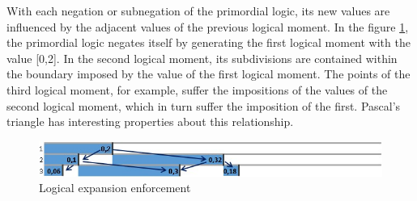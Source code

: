 With each negation or subnegation of the primordial logic, its new values are influenced by the adjacent values of the previous logical moment. In the figure \ref{fig:imposition_of_binomial_expansion}, the primordial logic negates itself by generating the first logical moment with the value [0,2].  In the second logical moment, its subdivisions are contained within the boundary imposed by the value of the first logical moment. The points of the third logical moment, for example, suffer the impositions of the values of the second logical moment, which in turn suffer the imposition of the first. Pascal's triangle has interesting properties about this relationship. 
	\begin{figure}[H]
	\caption{Logical expansion enforcement}
	\label{fig:imposition_of_binomial_expansion}
	\centering
	\includegraphics[scale=.75]{sections/images/imposition_of_binomial_expansion.jpg}
	\end{figure}

